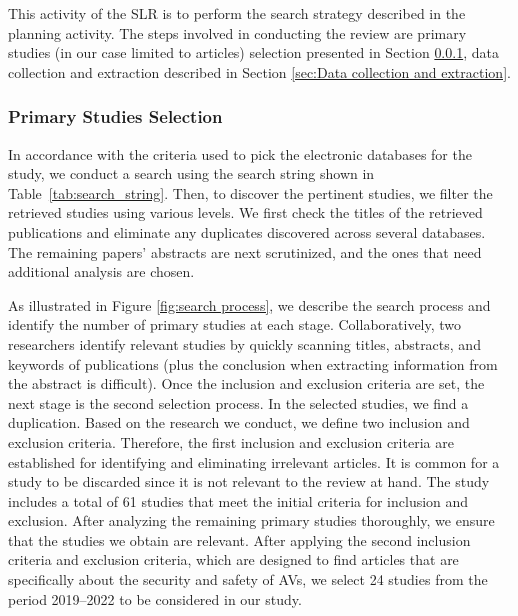 \documentclass[a4paper,12pt]{article}
\begin{document}
\hspace{5mm} This activity of the SLR is to perform the search strategy described in the planning activity. The steps involved in conducting the review are primary studies (in our case limited to articles) selection presented in Section \ref{tab:Primary Studies Selection}, data collection and extraction described in Section \ref{sec:Data collection and extraction}. 


\subsubsection{Primary Studies Selection}
\label{tab:Primary Studies Selection}

\hspace{5mm} In accordance with the criteria used to pick the electronic databases for the study, we conduct a search using the search string shown in Table~\ref{tab:search_string}. Then, to discover the pertinent studies, we filter the retrieved studies using various levels. We first check the titles of the retrieved publications and eliminate any duplicates discovered across several databases. The remaining papers' abstracts are next scrutinized, and the ones that need additional analysis are chosen.

As illustrated in Figure \ref{fig:search process}, we describe the search process and identify the number of primary studies at each stage. Collaboratively, two researchers identify relevant studies by quickly scanning titles, abstracts, and keywords of publications (plus the conclusion when extracting information from the abstract is difficult). Once the inclusion and exclusion criteria are set, the next stage is the second selection process. In the selected studies, we find a duplication. Based on the research we conduct, we define two inclusion and exclusion criteria. Therefore, the first inclusion and exclusion criteria are established for identifying and eliminating irrelevant articles. It is common for a study to be discarded since it is not relevant to the review at hand. The study includes a total of 61 studies that meet the initial criteria for inclusion and exclusion. After analyzing the remaining primary studies thoroughly, we ensure that the studies we obtain are relevant. After applying the second inclusion criteria and exclusion criteria, which are designed to find articles that are specifically about the security and safety of AVs, we select 24 studies from the period 2019–2022 to be considered in our study.
\end{document}
